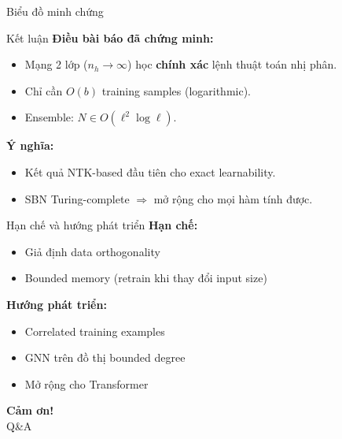 \begin{frame}{Biểu đồ minh chứng}
\centering
{}
\end{frame}

\begin{frame}{Kết luận}
  \textbf{Điều bài báo đã chứng minh:}
  \begin{itemize}
    \item Mạng 2 lớp ($n_h \to \infty$) học \textbf{chính xác} lệnh thuật toán nhị phân.
    \item Chỉ cần $O(b)$ training samples (logarithmic).
    \item Ensemble: $N \in O(\ell^2 \log \ell)$.
  \end{itemize}

  \vspace{0.3cm}
  \textbf{Ý nghĩa:}
  \begin{itemize}
    \item Kết quả NTK-based đầu tiên cho exact learnability.
    \item SBN Turing-complete $\Rightarrow$ mở rộng cho mọi hàm tính được.
  \end{itemize}
\end{frame}

\begin{frame}{Hạn chế và hướng phát triển}
  \textbf{Hạn chế:}
  \begin{itemize}
    \item Giả định data orthogonality
    \item Bounded memory (retrain khi thay đổi input size)
  \end{itemize}

  \vspace{0.3cm}
  \textbf{Hướng phát triển:}
  \begin{itemize}
    \item Correlated training examples
    \item GNN trên đồ thị bounded degree
    \item Mở rộng cho Transformer
  \end{itemize}
\end{frame}

\begin{frame}{}
  \centering
  \vfill
  {\Huge \textbf{Cảm ơn!}}\\[0.5cm]
  {\Large Q\&A}
  \vfill
\end{frame}
